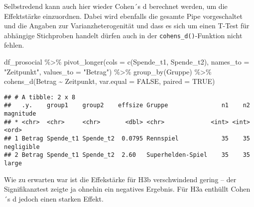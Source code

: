 \documentclass[
]{book}
\newenvironment{Shaded}{\begin{snugshade}}{\end{snugshade}}
\newcommand{\AttributeTok}[1]{\textcolor[rgb]{0.77,0.63,0.00}{#1}}
\newcommand{\ConstantTok}[1]{\textcolor[rgb]{0.00,0.00,0.00}{#1}}
\newcommand{\FunctionTok}[1]{\textcolor[rgb]{0.00,0.00,0.00}{#1}}
\newcommand{\NormalTok}[1]{#1}
\newcommand{\SpecialCharTok}[1]{\textcolor[rgb]{0.00,0.00,0.00}{#1}}
\newcommand{\StringTok}[1]{\textcolor[rgb]{0.31,0.60,0.02}{#1}}
\begin{document}
Selbstredend kann auch hier wieder Cohen´s d berechnet werden, um die Effektstärke einzuordnen. Dabei wird ebenfalls die gesamte Pipe vorgeschaltet und die Angaben zur Varianzheterogenität und dass es sich um einen T-Test für abhängige Stichproben handelt dürfen auch in der \texttt{cohens\_d()}-Funktion nicht fehlen.

\begin{Shaded}
\begin{Highlighting}[]
\NormalTok{df\_prosocial }\SpecialCharTok{\%\textgreater{}\%}
      \FunctionTok{pivot\_longer}\NormalTok{(}\AttributeTok{cols =} \FunctionTok{c}\NormalTok{(Spende\_t1, Spende\_t2), }
                   \AttributeTok{names\_to =} \StringTok{"Zeitpunkt"}\NormalTok{, }
                   \AttributeTok{values\_to =} \StringTok{"Betrag"}\NormalTok{) }\SpecialCharTok{\%\textgreater{}\%} 
      \FunctionTok{group\_by}\NormalTok{(Gruppe) }\SpecialCharTok{\%\textgreater{}\%} 
      \FunctionTok{cohens\_d}\NormalTok{(Betrag }\SpecialCharTok{\textasciitilde{}}\NormalTok{ Zeitpunkt, }
             \AttributeTok{var.equal =} \ConstantTok{FALSE}\NormalTok{, }
             \AttributeTok{paired =} \ConstantTok{TRUE}\NormalTok{) }
\end{Highlighting}
\end{Shaded}

\begin{verbatim}
## # A tibble: 2 x 8
##   .y.    group1    group2    effsize Gruppe               n1    n2 magnitude 
## * <chr>  <chr>     <chr>       <dbl> <chr>             <int> <int> <ord>     
## 1 Betrag Spende_t1 Spende_t2  0.0795 Rennspiel            35    35 negligible
## 2 Betrag Spende_t1 Spende_t2  2.60   Superhelden-Spiel    35    35 large
\end{verbatim}

Wie zu erwarten war ist die Effekstärke für H3b verschwindend gering -- der Signifikanztest zeigte ja ohnehin ein negatives Ergebnis. Für H3a enthüllt Cohen´s d jedoch einen starken Effekt.

  
\end{document}
